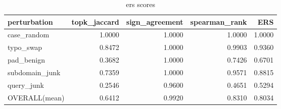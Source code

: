 \begin{table}[htbp]
\caption{ers scores}
\label{tab:ers_scores}
\begin{tabular}{lrrrr}
\toprule
perturbation & topk_jaccard & sign_agreement & spearman_rank & ERS \\
\midrule
case\_random & 1.0000 & 1.0000 & 1.0000 & 1.0000 \\
typo\_swap & 0.8472 & 1.0000 & 0.9903 & 0.9360 \\
pad\_benign & 0.3682 & 1.0000 & 0.7426 & 0.6701 \\
subdomain\_junk & 0.7359 & 1.0000 & 0.9571 & 0.8815 \\
query\_junk & 0.2546 & 0.9600 & 0.4651 & 0.5294 \\
OVERALL(mean) & 0.6412 & 0.9920 & 0.8310 & 0.8034 \\
\bottomrule
\end{tabular}
\end{table}
